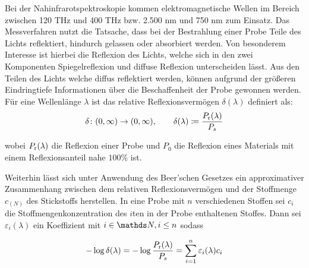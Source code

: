 		Bei der Nahinfrarotspektroskopie kommen elektromagnetische Wellen im Bereich zwischen 120 THz und 400 THz bzw. 2.500 nm und 750 nm zum Einsatz. \cite{Agelet2010}
		Das Messverfahren nutzt die Tatsache, dass bei der Bestrahlung einer Probe Teile des Lichts reflektiert, hindurch gelassen oder absorbiert werden.
		Von besonderem Interesse ist hierbei die Reflexion des Lichts, welche sich in den zwei Komponenten Spiegelreflexion und diffuse Reflexion unterscheiden lässt.
		Aus den Teilen des Lichts welche diffus reflektiert werden, können aufgrund der größeren Eindringtiefe Informationen über die Beschaffenheit der Probe gewonnen werden. \cite{Agelet2010}
		Für eine Wellenlänge $\lambda$ ist das relative Reflexionsvermögen $\delta(\lambda)$ definiert als:
		\[
			\delta\colon(0,\infty)\to(0,\infty),\qquad \delta(\lambda) \coloneqq \frac{P_{\mathrm{r}}(\lambda)}{P_s}
		\]
		
		wobei $P_{\mathrm{r}}(\lambda)$ die Reflexion einer Probe und $P_0$ die Reflexion eines Materials mit einem Reflexionsanteil nahe $100\%$ ist. 
		
		Weiterhin lässt sich unter Anwendung des Beer'schen Gesetzes ein approximativer Zusammenhang zwischen dem relativen Reflexionsvermögen und der Stoffmenge $c_{(N)}$ des Stickstoffs herstellen.
		In eine Probe mit $n$ verschiedenen Stoffen sei $c_i$ die Stoffmengenkonzentration des $i$ten in der Probe enthaltenen Stoffes. 
		Dann sei $\varepsilon_i(\lambda)$ ein Koeffizient mit $i\in\SN,i\leq n$ sodass
		
		\[
			-\log \delta(\lambda) = -\log \frac{P_{\mathrm{r}}(\lambda)}{P_s} = \sum_{i=1}^{n} \varepsilon_i(\lambda) c_i
		\]



